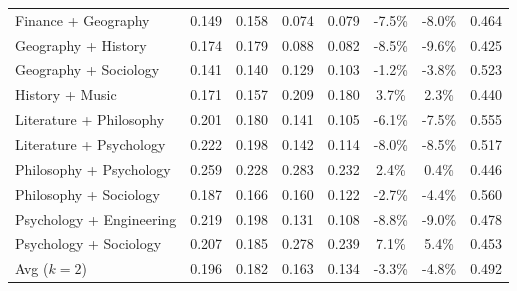 \begin{table}[!ht]
\begin{subtable}[t]{\textwidth}
\begin{tabular}{lccccccc}
Finance + Geography                                & 0.149 & 0.158 & 0.074 & 0.079 & -7.5\% & -8.0\% & 0.464 \\
Geography + History                                & 0.174 & 0.179 & 0.088 & 0.082 & -8.5\% & -9.6\% & 0.425 \\
Geography + Sociology                              & 0.141 & 0.140 & 0.129 & 0.103 & -1.2\% & -3.8\% & 0.523 \\
History + Music                                    & 0.171 & 0.157 & 0.209 & 0.180 & 3.7\% & 2.3\% & 0.440 \\
Literature + Philosophy                            & 0.201 & 0.180 & 0.141 & 0.105 & -6.1\% & -7.5\% & 0.555 \\
Literature + Psychology                            & 0.222 & 0.198 & 0.142 & 0.114 & -8.0\% & -8.5\% & 0.517 \\
Philosophy + Psychology                            & 0.259 & 0.228 & 0.283 & 0.232 & 2.4\% & 0.4\% & 0.446 \\
Philosophy + Sociology                             & 0.187 & 0.166 & 0.160 & 0.122 & -2.7\% & -4.4\% & 0.560 \\
Psychology + Engineering                           & 0.219 & 0.198 & 0.131 & 0.108 & -8.8\% & -9.0\% & 0.478 \\
Psychology + Sociology                             & 0.207 & 0.185 & 0.278 & 0.239 & 7.1\% & 5.4\% & 0.453 \\
\midrule
Avg ($k{=}2$) & 0.196 & 0.182 & 0.163 & 0.134 & -3.3\% & -4.8\% & 0.492 \\
\bottomrule
\end{tabular}
\end{subtable}

\end{table}

